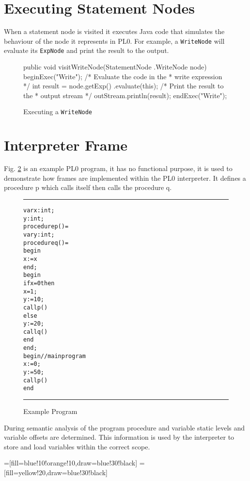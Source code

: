 \documentclass[a4paper,twoside,twocolumn]{article}
\begin{document}
\section{Executing Statement Nodes}\label{section:statements}
When a statement node is visited it executes Java code that simulates the
behaviour of the node it represents in PL0. For example, a \texttt{WriteNode}
will evaluate its \texttt{ExpNode} and print the result to the output.

\begin{figure}[H]
\begin{java}
public void visitWriteNode(StatementNode
        .WriteNode node) {
    beginExec("Write");
    /* Evaluate the code in the
     * write expression */
    int result = node.getExp()
            .evaluate(this);
    /* Print the result to the 
     * output stream */
    outStream.println(result);
    endExec("Write");
}
\end{java}
\caption{Executing a \texttt{WriteNode}}\label{figure:writenode}
\end{figure}

\section{Interpreter Frame}\label{section:frame}

Fig. \ref{figure:exampleprog} is an example PL0 program, it has no functional
purpose, it is used to demonstrate how frames are implemented within the PL0
interpreter. It defines a procedure p which calls itself then calls the
procedure q.

\begin{figure}[H]
\rule{\columnwidth}{0.5pt}
\begin{alltt}
var x: int;
    y: int;
procedure p() =
  var y: int;
  procedure q() =
    begin
      x := x
    end;
  begin
    if x = 0 then
      x = 1;
      y := 10;
      call p()
    else
      y := 20;
      call q()
    end
  end;
begin // main program
  x := 0;
  y := 50;
  call p()
end
\end{alltt}
\rule{\columnwidth}{0.5pt}
\caption{Example Program}\label{figure:exampleprog}
\end{figure}

During semantic analysis of the program procedure and variable static levels
and variable offsets are determined.
This information is used by the interpreter to store and load variables within
the correct scope.


=[fill=blue!10!orange!10,draw=blue!30!black]
=[fill=yellow!20,draw=blue!30!black]
\end{document}
